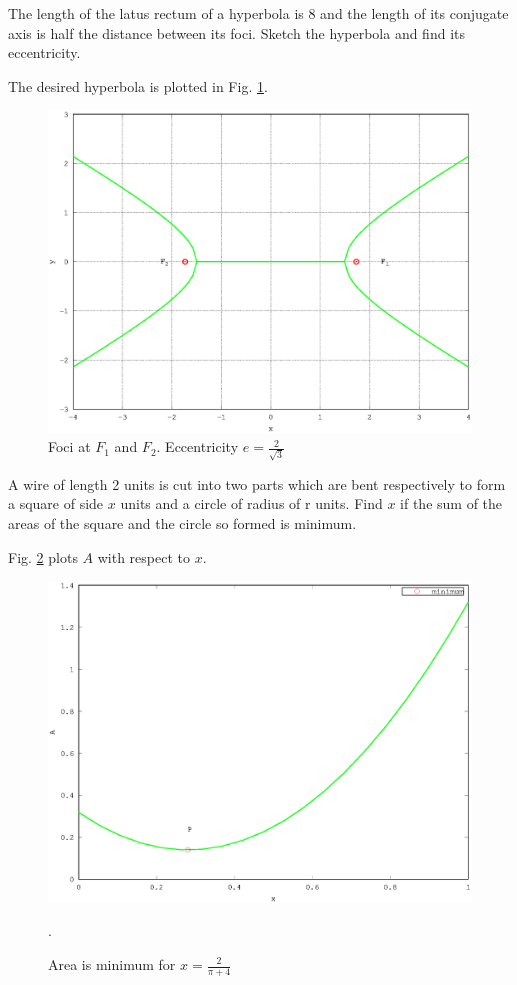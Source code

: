 \documentclass[journal,12pt,twocolumn]{IEEEtran}
\begin{document}
\renewcommand{\thefigure}{\theproblem}
\begin{problem}
The length of the latus rectum of a hyperbola is 8 and the length of its conjugate axis is half the distance between its foci.  Sketch the hyperbola and find its eccentricity.
\end{problem}
\solution

The desired hyperbola is plotted in Fig. \ref{fig_38}.

%
\begin{figure}[h]
\centering
\includegraphics[width=\columnwidth]{./figs/ee16b1038}
\caption{ Foci at $F_1$ and $F_2$. Eccentricity $e = \frac{2}{\sqrt{3}}$}
\label{fig_38}	
\end{figure}
%
\begin{problem}
A wire of length 2 units is cut into two parts which are bent respectively to form a square of side $x$ units and a circle of radius of r units. Find $x$ if the sum of the areas of the square and the circle so formed is minimum.
\end{problem}
\solution

Fig. \ref{fig_39} plots $A$ with respect to $x$.

%
\begin{figure}[h]
\centering
\includegraphics[width=\columnwidth]{./figs/ee16b1039}
\caption{ Area is minimum for $x = \frac{2}{\pi + 4}$}.
\label{fig_39}	
\end{figure}
%
\end{document}
